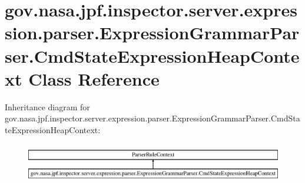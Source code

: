 \hypertarget{classgov_1_1nasa_1_1jpf_1_1inspector_1_1server_1_1expression_1_1parser_1_1_expression_grammar_pa4cb3092c60a124c5db4482cce4b4fe10}{}\section{gov.\+nasa.\+jpf.\+inspector.\+server.\+expression.\+parser.\+Expression\+Grammar\+Parser.\+Cmd\+State\+Expression\+Heap\+Context Class Reference}
\label{classgov_1_1nasa_1_1jpf_1_1inspector_1_1server_1_1expression_1_1parser_1_1_expression_grammar_pa4cb3092c60a124c5db4482cce4b4fe10}
Inheritance diagram for gov.\+nasa.\+jpf.\+inspector.\+server.\+expression.\+parser.\+Expression\+Grammar\+Parser.\+Cmd\+State\+Expression\+Heap\+Context\+:\begin{figure}[H]
\begin{center}
\leavevmode
\includegraphics[height=1.752739cm]{classgov_1_1nasa_1_1jpf_1_1inspector_1_1server_1_1expression_1_1parser_1_1_expression_grammar_pa4cb3092c60a124c5db4482cce4b4fe10}
\end{center}
\end{figure}
